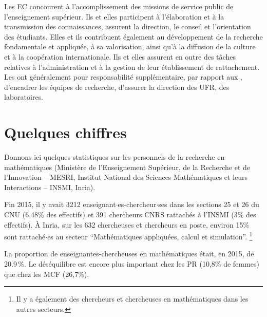  

Les EC concourent \`a l'accomplissement des missions de service
public de l'enseignement sup\'erieur. Ils et elles participent \`a
l'\'elaboration et \`a la transmission des connaissances, assurent
la direction, le conseil et l'orientation des \'etudiants. Elles et ils
contribuent \'egalement au d\'eveloppement de la recherche
fondamentale et appliqu\'ee, \`a sa valorisation, ainsi qu'\`a la
diffusion de la culture et \`a la coop\'eration internationale. Ils et elles
assurent en outre des t\^aches relatives \`a l'administration et \`a
la gestion de leur \'etablissement de rattachement. Les \PR ont g\'en\'eralement pour responsabilit\'e suppl\'ementaire, par
rapport aux \MCF, d'encadrer les \'equipes de
recherche, d'assurer la direction des UFR, des laboratoires.


\section{Quelques chiffres}

{\enlargethispage{.5cm}
Donnons ici quelques statistiques sur les personnels de la recherche en math\'ematiques 
(Minist{\`e}re de l'Enseignement Sup{\'e}rieur, de la Recherche et de l'Innovation -- MESRI, 
Institut National des Sciences Math\'ematiques et leurs Interactions -- INSMI, Inria).
}

Fin 2015, il y avait 3212 enseignant$\cdot$es-chercheur$\cdot$ses dans les sections 25 et 26 du CNU (6,48\% des effectifs) et
391 chercheurs CNRS rattach\'es \`a l'INSMI (3\% des effectifs).
\`A Inria, sur les 632 chercheuses et chercheurs en poste, environ 15\% sont rattach\'e$\cdot$es au secteur ``Math\'ematiques appliqu\'ees, calcul et simulation''.%
\footnote{Il y a \'egalement des chercheurs et chercheuses en math\'ematiques dans les autres secteurs.}

La proportion de enseignantes-chercheuses en math\'ematiques \'etait, en 2015, de 20.9\,\%. %
Le d\'es\'equilibre est encore plus important chez les PR (10,8\% de %
femmes) que chez les MCF (26,7\%). %

